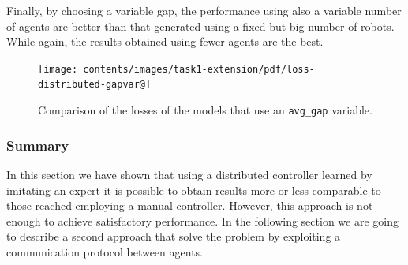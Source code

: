 Finally, by choosing a variable gap, the performance using also a variable number 
of agents are better than that generated using a fixed but big number of robots. 
While again, the results obtained using fewer agents are the best.
\begin{figure}[!htb]
	\centering
	\texttt{[image: contents/images/task1-extension/pdf/loss-distributed-gapvar@]}%
	\caption{Comparison of the losses of the models that use an \texttt{avg\_gap} 
	variable.}
	\label{fig:distlossvar}
\end{figure}

\subsubsection{Summary}
\label{subsubsec:summary}
In this section we have shown that using a distributed controller learned by 
imitating an expert it is possible to obtain results more or less comparable to 
those reached employing a manual controller.
However, this approach is not enough to achieve satisfactory performance. In the 
following section we are going to describe a second approach that solve the 
problem by exploiting a communication protocol between agents.